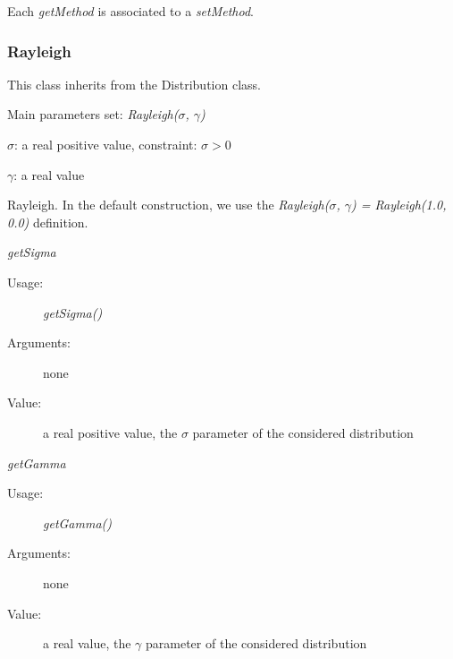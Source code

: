 Each  \textit{getMethod}  is associated to a \textit{setMethod}.

\newpage
\subsubsection{Rayleigh}

This class inherits from the Distribution class.

\begin{description}

\item[Usage:] Main parameters set: \textit{Rayleigh($\sigma$, $\gamma$)}

\item[Arguments:]  \rule{0pt}{1em}
\begin{description}
\item $\sigma$:  a real positive value, constraint: $\sigma > 0$
\item $\gamma$:  a real value
\end{description}

\item[Value:] Rayleigh. In the default construction, we use the \textit{Rayleigh($\sigma$, $\gamma$) = Rayleigh(1.0, 0.0)} definition.

\item[Some methods:]  \rule{0pt}{1em}
\begin{description}

\item \textit{getSigma}
\begin{description}
\item[Usage:] \textit{getSigma()}
\item[Arguments:] none
\item[Value:]  a real positive value, the  $\sigma$ parameter of the considered distribution
\end{description}
\bigskip
\item \textit{getGamma}
\begin{description}
\item[Usage:] \textit{getGamma()}
\item[Arguments:] none
\item[Value:]  a real value, the  $\gamma$ parameter of the considered distribution
\end{description}
\bigskip
\end{description}


\end{description}
